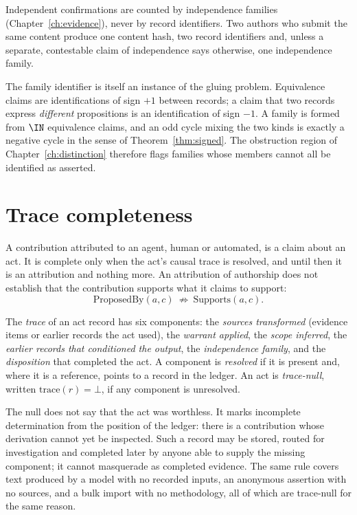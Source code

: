 Independent confirmations are counted by independence families (Chapter~\ref{ch:evidence}), never by record identifiers. Two authors who submit the same content produce one content hash, two record identifiers and, unless a separate, contestable claim of independence says otherwise, one independence family.

The family identifier is itself an instance of the gluing problem. Equivalence claims are identifications of sign $+1$ between records; a claim that two records express \emph{different} propositions is an identification of sign $-1$. A family is formed from $\IN$ equivalence claims, and an odd cycle mixing the two kinds is exactly a negative cycle in the sense of Theorem~\ref{thm:signed}. The obstruction region of Chapter~\ref{ch:distinction} therefore flags families whose members cannot all be identified as asserted.

\section{Trace completeness}\label{sec:trace}

A contribution attributed to an agent, human or automated, is a claim about an act. It is complete only when the act's causal trace is resolved, and until then it is an attribution and nothing more. An attribution of authorship does not establish that the contribution supports what it claims to support:
\[
\mathrm{ProposedBy}(a,c)\ \not\Rightarrow\ \mathrm{Supports}(a,c).
\]

\begin{definition}[Trace]\label{def:trace}
The \emph{trace} of an act record has six components: the \emph{sources transformed} (evidence items or earlier records the act used), the \emph{warrant applied}, the \emph{scope inferred}, the \emph{earlier records that conditioned the output}, the \emph{independence family}, and the \emph{disposition} that completed the act. A component is \emph{resolved} if it is present and, where it is a reference, points to a record in the ledger. An act is \emph{trace-null}, written $\mathrm{trace}(r)=\bot$, if any component is unresolved.
\end{definition}

The null does not say that the act was worthless. It marks incomplete determination from the position of the ledger: there is a contribution whose derivation cannot yet be inspected. Such a record may be stored, routed for investigation and completed later by anyone able to supply the missing component; it cannot masquerade as completed evidence. The same rule covers text produced by a model with no recorded inputs, an anonymous assertion with no sources, and a bulk import with no methodology, all of which are trace-null for the same reason.

